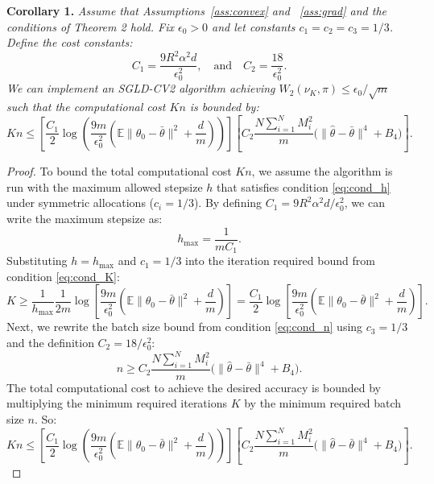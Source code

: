 \textbf{Corollary 1.} \textit{Assume that Assumptions~\ref{ass:convex} and ~\ref{ass:grad} and the conditions of Theorem 2 hold. Fix $\epsilon_0 > 0$ and let constants $c_1 = c_2 = c_3 = 1/3$. Define the cost constants:}
\begin{equation}
    C_1 = \frac{9 R^2 \alpha^2 d}{\epsilon_0^2}, \quad \text{and} \quad C_2 = \frac{18}{\epsilon_0^2}.
\end{equation}
\textit{We can implement an SGLD-CV2 algorithm achieving $W_2(\nu_K, \pi) \leq \epsilon_0/\sqrt{m}$ such that the computational cost $Kn$ is bounded by:}
\begin{equation}
    Kn \leq \left[ \frac{C_1}{2} \log\left( \frac{9m}{\epsilon_0^2}\left(\mathbb{E}\|\theta_0 - \bar\theta\|^2 + \frac{d}{m}\right) \right) \right] \left[ C_2 \frac{N \sum_{i=1}^N M_i^2}{m} \Big( \|\hat\theta - \bar\theta\|^4 + B_4 \Big) \right].
\end{equation}

\begin{proof}
To bound the total computational cost $Kn$, we assume the algorithm is run with the maximum allowed stepsize $h$ that satisfies condition \eqref{eq:cond_h} under symmetric allocations ($c_i=1/3$). By defining $C_1 = 9 R^2 \alpha^2 d / \epsilon_0^2$, we can write the maximum stepsize as:
\begin{equation}
    h_{\max} = \frac{1}{m C_1}.
\end{equation}
Substituting $h = h_{\max}$ and $c_1=1/3$ into the iteration required bound from condition \eqref{eq:cond_K}:
\begin{equation}
    K \geq \frac{1}{h_{\max}} \frac{1}{2m} \log\left[ \frac{9m}{\epsilon_0^2} \left( \mathbb{E}\|\theta_0 - \bar\theta\|^2 + \frac{d}{m} \right) \right] = \frac{C_1}{2} \log\left[ \frac{9m}{\epsilon_0^2} \left( \mathbb{E}\|\theta_0 - \bar\theta\|^2 + \frac{d}{m} \right) \right].
\end{equation}
Next, we rewrite the batch size bound from condition \eqref{eq:cond_n} using $c_3=1/3$ and the definition $C_2 = 18 / \epsilon_0^2$:
\begin{equation}
    n \geq C_2 \frac{N \sum_{i=1}^N M_i^2}{m} \Big( \|\hat\theta - \bar\theta\|^4 + B_4 \Big).
\end{equation}
The total computational cost to achieve the desired accuracy is bounded by multiplying the minimum required iterations $K$ by the minimum required batch size $n$. So:
\begin{equation}
    Kn \leq \left[ \frac{C_1}{2} \log\left( \frac{9m}{\epsilon_0^2}\left(\mathbb{E}\|\theta_0 - \bar\theta\|^2 + \frac{d}{m}\right) \right) \right] \left[ C_2 \frac{N \sum_{i=1}^N M_i^2}{m} \Big( \|\hat\theta - \bar\theta\|^4 + B_4 \Big) \right].
\end{equation}
\end{proof}


